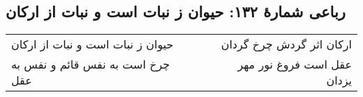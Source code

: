 \begin{center}
\section*{رباعی شمارهٔ ۱۳۲: حیوان ز نبات است و نبات از ارکان}
\label{sec:132}
\begin{longtable}{l p{0.5cm} r}
حیوان ز نبات است و نبات از ارکان
&&
ارکان اثر گردش چرخ گردان
\\
چرخ است به نفس قائم و نفس به عقل
&&
عقل است فروغ نور مهر یزدان
\\
\end{longtable}
\end{center}
